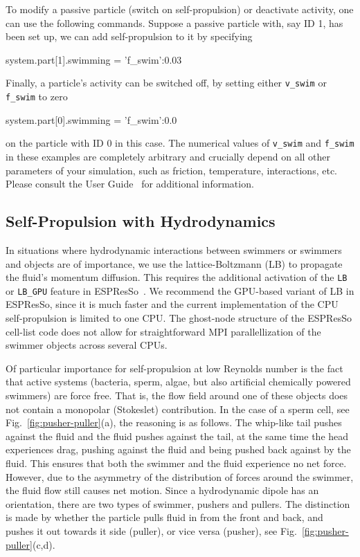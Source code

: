 \documentclass[aip,jcp,reprint,a4paper,onecolumn,amsmath]{revtex4-1}
\newcommand\code{\lstinline}
\newcommand{\es}{\mbox{\textsf{ESPResSo}}\xspace}
\newcommand\codees{\lstinline[language=python]}
\begin{document}
To modify a passive particle (switch on self-propulsion) or deactivate activity, one can use the following commands. Suppose a passive particle with, say ID 1, has been set up, we can add self-propulsion to it by specifying
\begin{espresso}
system.part[1].swimming = {'f_swim':0.03}
\end{espresso}
Finally, a particle's activity can be switched off, by setting either \codees{v_swim} or \codees{f_swim} to zero
\begin{espresso}
system.part[0].swimming = {'f_swim':0.0}
\end{espresso}
on the particle with ID 0 in this case. The numerical values of \codees{v_swim} and \codees{f_swim} in these examples are completely arbitrary and crucially depend on all other parameters of your simulation, such as friction, temperature, interactions, etc. Please consult the User Guide~\cite{UG} for additional information.

\subsection{\label{sub:lattice}Self-Propulsion with Hydrodynamics}

In situations where hydrodynamic interactions between swimmers or swimmers and objects are of importance, we use the lattice-Boltzmann (LB) to propagate the fluid's momentum diffusion. This requires the additional activation of the \code{LB} or \code{LB_GPU} feature in \es{}~\cite{UG,Arnold_13,roehm12}. We recommend the GPU-based variant of LB in \es{}, since it is much faster and the current implementation of the CPU self-propulsion is limited to one CPU. The ghost-node structure of the \es{} cell-list code does not allow for straightforward MPI parallellization of the swimmer objects across several CPUs.

Of particular importance for self-propulsion at low Reynolds number is the fact that active systems (bacteria, sperm, algae, but also artificial chemically powered swimmers) are force free. That is, the flow field around one of these objects does not contain a monopolar (Stokeslet) contribution. In the case of a sperm cell, see Fig.~\ref{fig:pusher-puller}(a), the reasoning is as follows. The whip-like tail pushes against the fluid and the fluid pushes against the tail, at the same time the head experiences drag, pushing against the fluid and being pushed back against by the fluid. This ensures that both the swimmer and the fluid experience no net force. However, due to the asymmetry of the distribution of forces around the swimmer, the fluid flow still causes net motion. Since a hydrodynamic dipole has an orientation, there are two types of swimmer, pushers and pullers. The distinction is made by whether the particle pulls fluid in from the front and back, and pushes it out towards it side (puller), or vice versa (pusher), see Fig.~\ref{fig:pusher-puller}(c,d).
\end{document}
